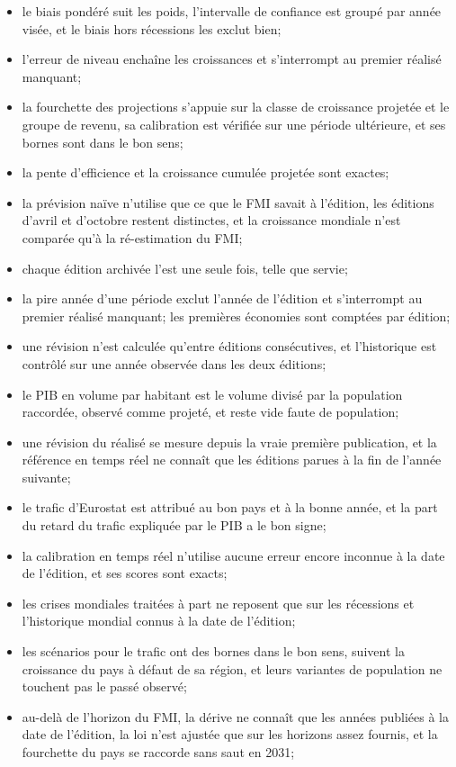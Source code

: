 \documentclass[11pt,a4paper]{article}
\begin{document}
\begin{itemize}
    \item le biais pondéré suit les poids, l'intervalle de confiance est groupé par année visée, et le biais hors récessions les exclut bien;
    \item l'erreur de niveau enchaîne les croissances et s'interrompt au premier réalisé manquant;
    \item la fourchette des projections s'appuie sur la classe de croissance projetée et le groupe de revenu, sa calibration est vérifiée sur une période ultérieure, et ses bornes sont dans le bon sens;
    \item la pente d'efficience et la croissance cumulée projetée sont exactes;
    \item la prévision naïve n'utilise que ce que le FMI savait à l'édition, les éditions d'avril et d'octobre restent distinctes, et la croissance mondiale n'est comparée qu'à la ré-estimation du FMI;
    \item chaque édition archivée l'est une seule fois, telle que servie;
    \item la pire année d'une période exclut l'année de l'édition et s'interrompt au premier réalisé manquant; les premières économies sont comptées par édition;
    \item une révision n'est calculée qu'entre éditions consécutives, et l'historique est contrôlé sur une année observée dans les deux éditions;
    \item le PIB en volume par habitant est le volume divisé par la population raccordée, observé comme projeté, et reste vide faute de population;
    \item une révision du réalisé se mesure depuis la vraie première publication, et la référence en temps réel ne connaît que les éditions parues à la fin de l'année suivante;
    \item le trafic d'Eurostat est attribué au bon pays et à la bonne année, et la part du retard du trafic expliquée par le PIB a le bon signe;
    \item la calibration en temps réel n'utilise aucune erreur encore inconnue à la date de l'édition, et ses scores sont exacts;
    \item les crises mondiales traitées à part ne reposent que sur les récessions et l'historique mondial connus à la date de l'édition;
    \item les scénarios pour le trafic ont des bornes dans le bon sens, suivent la croissance du pays à défaut de sa région, et leurs variantes de population ne touchent pas le passé observé;
    \item au-delà de l'horizon du FMI, la dérive ne connaît que les années publiées à la date de l'édition, la loi n'est ajustée que sur les horizons assez fournis, et la fourchette du pays se raccorde sans saut en 2031;

\end{itemize}
\end{document}

